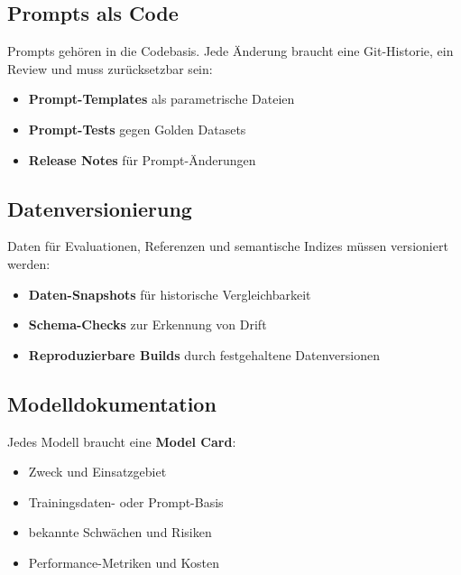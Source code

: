 \subsection{Prompts als Code}

Prompts gehören in die Codebasis. Jede Änderung braucht eine Git-Historie, ein Review und muss zurücksetzbar sein:

\begin{itemize}[leftmargin=*]
    \item \textbf{Prompt-Templates} als parametrische Dateien
    \item \textbf{Prompt-Tests} gegen Golden Datasets
    \item \textbf{Release Notes} für Prompt-Änderungen
\end{itemize}


\subsection{Datenversionierung}

Daten für Evaluationen, Referenzen und semantische Indizes müssen versioniert werden:

\begin{itemize}[leftmargin=*]
    \item \textbf{Daten-Snapshots} für historische Vergleichbarkeit
    \item \textbf{Schema-Checks} zur Erkennung von Drift
    \item \textbf{Reproduzierbare Builds} durch festgehaltene Datenversionen
\end{itemize}

\subsection{Modelldokumentation}

Jedes Modell braucht eine \textbf{Model Card}:

\begin{itemize}[leftmargin=*]
    \item Zweck und Einsatzgebiet
    \item Trainingsdaten- oder Prompt-Basis
    \item bekannte Schwächen und Risiken
    \item Performance-Metriken und Kosten
\end{itemize}

